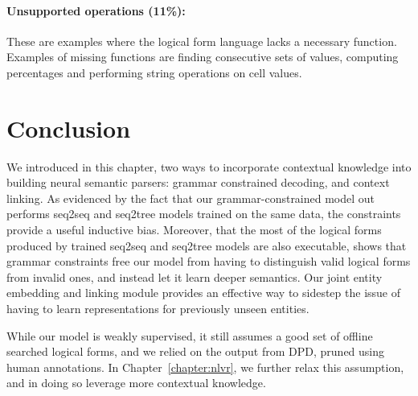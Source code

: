 \paragraph{Unsupported operations (11\%):} These are examples where the logical
form language lacks a necessary function. Examples of missing functions are
finding consecutive sets of values, computing percentages and performing string
operations on cell values.

\section{Conclusion}
We introduced in this chapter, two ways to incorporate contextual knowledge into
building neural semantic parsers: grammar constrained
decoding, and context linking. As evidenced by the fact that our
grammar-constrained model out performs seq2seq and seq2tree models trained on
the same data, the constraints provide a useful inductive bias. Moreover, that
the most of the logical forms produced by trained seq2seq and seq2tree models
are also executable, shows that grammar constraints free our model from having
to distinguish valid logical forms from invalid ones, and instead let it learn
deeper semantics. Our joint entity embedding and linking module provides an
effective way to sidestep the issue of having to learn representations for
previously unseen entities.

While our model is weakly supervised, it still assumes a good set of
offline searched logical forms, and we relied on the output from DPD, pruned
using human annotations. In Chapter~\ref{chapter:nlvr}, we further relax this
assumption, and in doing so leverage more contextual knowledge.
